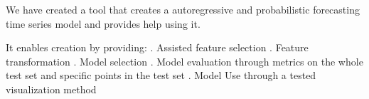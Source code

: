 We have created a tool that creates a autoregressive and probabilistic forecasting time series model and 
provides help using it.

It enables creation by providing:
. Assisted feature selection
. Feature transformation
. Model selection
. Model evaluation through metrics on the whole test set and specific points in the test set 
. Model Use through a tested visualization method
